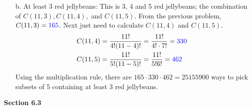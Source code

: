 \documentclass{article}
\begin{document}
\begin{itemize}
\begin{itemize}
        \item[b.] At least 3 red jellybeans: This is 3, 4 and 5 red jellybeans; the combination of $C(11,3), C(11,4),$ and $C(11,5)$. From the previous problem, $C(11,3)={\color{blue}165}$. Next just need to calculate $C(11,4)$ and $C(11,5)$.
        \begin{align}
            C(11,4)&=\frac{11!}{4!(11-4)!}=\frac{11!}{4!\cdot7!}={\color{blue}330}\nonumber\\
            C(11,5)&=\frac{11!}{5!(11-5)!}=\frac{11!}{5!6!}={\color{blue}462}\nonumber
        \end{align}
        {\color{blue}Using the multiplication rule, there are $165\cdot330\cdot462=25155900$  ways to pick subsets of 5 containing at least 3 red jellybeans.}
    \end{itemize}
\end{itemize}
\textbf{Section 6.3}
\end{document}
